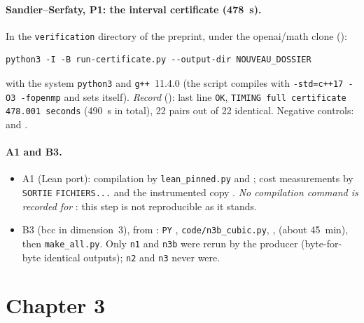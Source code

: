 \paragraph{Sandier--Serfaty, P1: the interval certificate (478~s).} In the \texttt{verification} directory of the
preprint, under the openai/math clone
():
\begin{lstlisting}[style=appC,language={}]
python3 -I -B run-certificate.py --output-dir NOUVEAU_DOSSIER
\end{lstlisting}
with the system \texttt{python3} and \texttt{g++}~11.4.0 (the script compiles with \texttt{-std=c++17 -O3 -fopenmp} and
sets  itself). \emph{Record} (): last line
\texttt{OK}, \texttt{TIMING full certificate 478.001 seconds} (490~s in total), 22 pairs out of 22 identical. Negative
controls:  and .

\paragraph{A1 and B3.}
\begin{itemize}
\item A1 (Lean port): compilation by \texttt{lean\_pinned.py} and ;
cost measurements by  \texttt{SORTIE} \texttt{FICHIERS...} and the instrumented copy
. \emph{No compilation command is recorded for
}: this step is not reproducible as it stands.
\item B3 (bcc in dimension~3), from : \texttt{PY} ,
\texttt{code/n3b\_cubic.py}, ,  (about 45~min), then
\texttt{make\_all.py}. Only \texttt{n1} and \texttt{n3b} were rerun by the producer (byte-for-byte identical outputs);
\texttt{n2} and \texttt{n3} never were.
\end{itemize}

\section{Chapter 3}\label{appE:sec:ch3}

